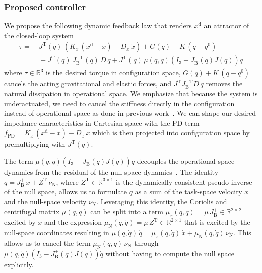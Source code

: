 \subsubsection{Proposed controller}
We propose the following dynamic feedback law that renders $x^\mathrm{d}$ an attractor of the closed-loop system %
\begin{equation}\label{eq:hsacontrol:task_space_impedance_control:cartesian_impedance_controller}
\begin{split}
    \tau =& \: J^\mathrm{T}(q) \, \left (K_x \, (x^\mathrm{d} - x) - D_x \, \dot{x} \right ) + G(q) + K \, (q-q^0)\\
    & \: + J^\mathrm{T}(q) \, J_\mathrm{B}^{+\mathrm{T}}(q) \, D \, \dot{q} + J^\mathrm{T}(q) \, \mu(q,\dot{q}) \left ( I_3 - J_\mathrm{B}^+(q) J(q) \right )\dot{q}
\end{split}
\end{equation}
where $\tau \in \mathbb{R}^3$ is the desired torque in configuration space, $G(q) + K \, (q-q^0)$ cancels the acting gravitational and elastic forces, and $J^\mathrm{T} J_\mathrm{B}^{+\mathrm{T}} D \, \dot{q}$ removes the natural dissipation in operational space.
We emphasize that because the system is underactuated, we need to cancel the stiffness directly in the configuration instead of operational space as done in previous work~\cite{della2020model}.
We can shape our desired impedance characteristics in Cartesian space with the PD term $f_\mathrm{PD} = K_x \, (x^\mathrm{d} - x) - D_x \, \dot{x} $ which is then projected into configuration space by premultiplying with $J^\mathrm{T}(q)$.

The term $\mu(q,\dot{q}) \left ( I_3 - J_\mathrm{B}^+(q) J(q) \right )\dot{q}$ decouples the operational space dynamics from the residual of the null-space dynamics~\cite{della2020model}\cite[Ch. 4]{ott2008cartesian}.
The identity $\dot{q} = J_\mathrm{B}^+ \, \dot{x} + Z^\mathrm{T} \, \nu_\mathrm{N}$, where $Z^\mathrm{T} \in \mathbb{R}^{3 \times 1}$ is the dynamically-consistent pseudo-inverse of the null space, allows us to formulate $\dot{q}$ as a sum of the task-space velocity $\dot{x}$ and the null-space velocity $\nu_\mathrm{N}$. Leveraging this identity, the Coriolis and centrifugal matrix $\mu(q,\dot{q})$ can be split into a term $\mu_x(q,\dot{q}) = \mu \, J_\mathrm{B}^+ \in \mathbb{R}^{2 \times 2}$ excited by $x$ and the expression $\mu_\mathrm{N}(q,\dot{q}) = \mu \, Z^\mathrm{T} \in \mathbb{R}^{2 \times 1}$ that is excited by the null-space coordinates resulting in $\mu(q,\dot{q}) \, \dot{q} = \mu_x(q,\dot{q}) \, \dot{x} + \mu_\mathrm{N}(q,\dot{q}) \, \nu_\mathrm{N}$.
This allows us to cancel the term $\mu_\mathrm{N}(q,\dot{q}) \, \nu_\mathrm{N}$ through $\mu(q,\dot{q}) \left ( I_3 - J_\mathrm{B}^+(q) J(q) \right )\dot{q}$ without having to compute the null space explicitly.


